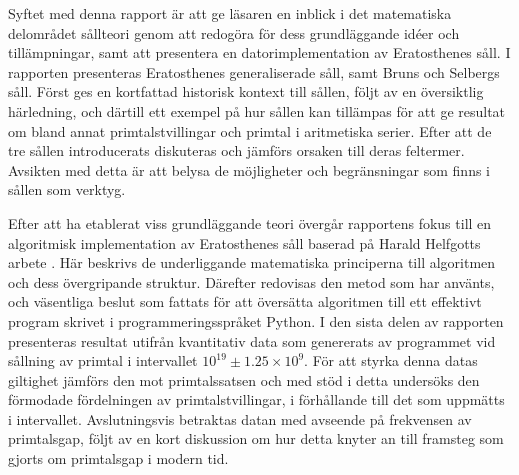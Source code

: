 Syftet med denna rapport är att ge läsaren en inblick i det matematiska delområdet sållteori genom att redogöra för dess grundläggande idéer och tillämpningar,
samt att presentera en datorimplementation av Eratosthenes såll.
%
I rapporten presenteras
Eratosthenes generaliserade såll,
samt Bruns och Selbergs såll.
Först ges en kortfattad historisk kontext till sållen,
följt av en översiktlig härledning,
och därtill ett exempel på hur sållen kan tillämpas
för att ge resultat om bland annat primtalstvillingar och primtal i aritmetiska serier.
%
Efter att de tre sållen introducerats diskuteras och jämförs orsaken till deras feltermer.
Avsikten med detta är att belysa de möjligheter och begränsningar som finns i sållen som verktyg.
%

%
Efter att ha etablerat viss grundläggande teori
övergår rapportens fokus till en algoritmisk implementation av Eratosthenes såll baserad på Harald Helfgotts arbete \cite{HaraldSieve}.
%
Här beskrivs de underliggande matematiska principerna till algoritmen och dess övergripande struktur. 
Därefter redovisas den metod som har använts, och väsentliga beslut som fattats
för att översätta algoritmen till ett effektivt program skrivet i programmeringsspråket Python.
%
I den sista delen av rapporten presenteras resultat utifrån kvantitativ data som genererats av programmet vid sållning av primtal i intervallet \(10^{19}\pm 1.25\times10^9\).
För att styrka denna datas giltighet jämförs den mot primtalssatsen och med stöd i detta undersöks den förmodade fördelningen av primtalstvillingar, i förhållande till det som uppmätts i intervallet.
Avslutningsvis betraktas datan med avseende på frekvensen av primtalsgap, följt av en kort diskussion om hur detta knyter an till framsteg som gjorts om primtalsgap i modern tid.